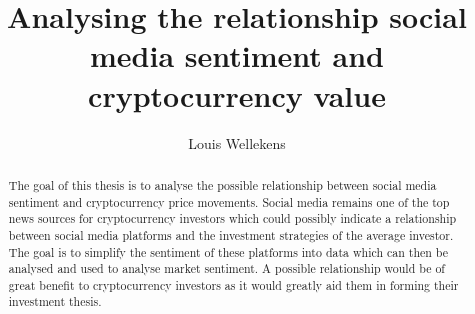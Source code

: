 \documentclass[english]{hogent-article}
\title{Analysing the relationship social media sentiment and cryptocurrency value }
\author{Louis Wellekens}
\begin{document}
\begin{abstract}
  The goal of this thesis is to analyse the possible relationship between social media sentiment and cryptocurrency price movements. Social media remains one of the top news sources for cryptocurrency investors which could possibly indicate a relationship between social media platforms and the investment strategies of the average investor. The goal is to simplify the sentiment of these platforms into data which can then be analysed and used to analyse market sentiment. A possible relationship would be of great benefit to cryptocurrency investors as it would greatly aid them in forming their investment thesis.
\end{abstract}

\tableofcontents



\printbibliography[heading=bibintoc]
\end{document}
